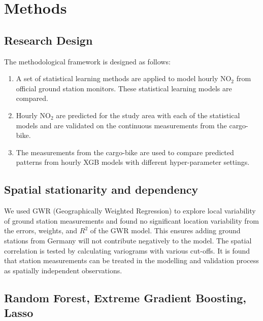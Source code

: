 \documentclass{article}
\begin{document}
\section{Methods}

\subsection{Research Design}
The methodological framework is designed as follows: 
\begin{enumerate}
    \item A set of statistical learning methods are applied to model hourly NO$_2$ from official ground station monitors. These statistical learning models are compared.  
    
    \item Hourly NO$_2$ are predicted for the study area with each of the statistical models and are validated on the continuous measurements from the cargo-bike.
    
    \item The measurements from the cargo-bike are used to compare predicted patterns from hourly XGB models with different hyper-parameter settings. 
    
\end{enumerate} 


\subsection{Spatial stationarity and dependency}
We used GWR (Geographically Weighted Regression) to explore local variability of ground station measurements and found no significant location variability from the errors, weights, and $R^2$ of the GWR model.  This ensures adding ground stations from Germany will not contribute negatively to the model. The spatial correlation is tested by calculating variograms with various cut-offs. It is found that station measurements can be treated in the modelling and validation process as spatially independent observations.


\subsection{Random Forest, Extreme Gradient Boosting, Lasso}
\end{document}
